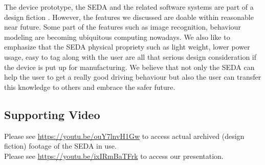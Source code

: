 \documentclass[main.tex]{subfiles}
\begin{document}

The device prototype, the SEDA and the related software systems are part of a design fiction \cite{designfiction}. However, the features we discussed are doable within reasonable near future. Some part of the features such as image recognition, behaviour modeling are becoming ubiquitous computing nowadays. We also like to emphasize that the SEDA physical propriety such as light weight, lower power usage, easy to tag along with the user are all that serious design consideration if the device is put up for manufacturing. We believe that not only the SEDA can help the user to get a really good driving behaviour but also the user can transfer this knowledge to others and embrace the safer future.



\subsection{Supporting Video}

Please see \url{https://youtu.be/ouY7lnvH1Gw} to access actual archived (design fiction) footage of the SEDA in use.
\\

Please see \url{https://youtu.be/ixIRmBaTFrk} to access our presentation.
\end{document}
